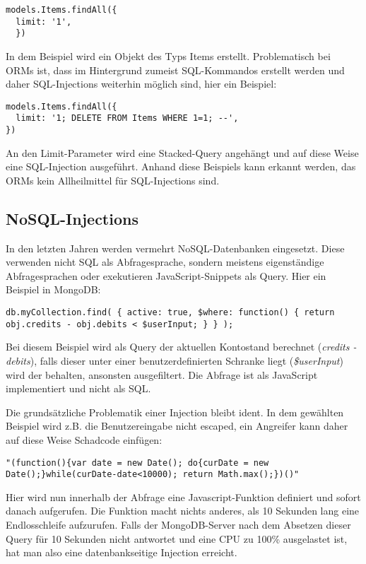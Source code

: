 \begin{verbatim}
models.Items.findAll({
  limit: '1',
  })
\end{verbatim}

In dem Beispiel wird ein Objekt des Typs Items erstellt. Problematisch bei ORMs ist, dass im Hintergrund zumeist SQL-Kommandos erstellt werden und daher SQL-Injections weiterhin möglich sind, hier ein Beispiel:

\begin{verbatim}
models.Items.findAll({
  limit: '1; DELETE FROM Items WHERE 1=1; --',
})
\end{verbatim}

An den Limit-Parameter wird eine Stacked-Query angehängt und auf diese Weise eine SQL-Injection ausgeführt. Anhand diese Beispiels kann erkannt werden, das ORMs kein Allheilmittel für SQL-Injections sind.

\subsection{NoSQL-Injections}

In den letzten Jahren werden vermehrt NoSQL-Datenbanken eingesetzt. Diese verwenden nicht SQL als Abfragesprache, sondern meistens eigenständige Abfragesprachen oder exekutieren JavaScript-Snippets als Query. Hier ein Beispiel in MongoDB:

\begin{verbatim}
db.myCollection.find( { active: true, $where: function() { return obj.credits - obj.debits < $userInput; } } );
\end{verbatim}

Bei diesem Beispiel wird als Query der aktuellen Kontostand berechnet (\textit{credits - debits}), falls dieser unter einer benutzerdefinierten Schranke liegt (\textit{\$userInput}) wird der behalten, ansonsten ausgefiltert. Die Abfrage ist als JavaScript implementiert und nicht als SQL.

Die grundsätzliche Problematik einer Injection bleibt ident. In dem gewählten Beispiel wird z.B. die Benutzereingabe nicht escaped, ein Angreifer kann daher auf diese Weise Schadcode einfügen:

\begin{verbatim}
"(function(){var date = new Date(); do{curDate = new Date();}while(curDate-date<10000); return Math.max();})()"
\end{verbatim}

Hier wird nun innerhalb der Abfrage eine Javascript-Funktion definiert und sofort danach aufgerufen. Die Funktion macht nichts anderes, als 10 Sekunden lang eine Endlosschleife aufzurufen. Falls der MongoDB-Server nach dem Absetzen dieser Query für 10 Sekunden nicht antwortet und eine CPU zu 100\% ausgelastet ist, hat man also eine datenbankseitige Injection erreicht.

